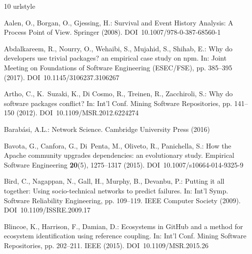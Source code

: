 \documentclass[smallextended]{svjour3}       %
\begin{document}
% 

\providecommand{\noopsort}[1]{}
\begin{thebibliography}{10}
\providecommand{\url}[1]{{#1}}
\providecommand{\urlprefix}{URL }
\expandafter\ifx\csname urlstyle\endcsname\relax
  \providecommand{\doi}[1]{DOI~\discretionary{}{}{}#1}\else
  \providecommand{\doi}{DOI~\discretionary{}{}{}\begingroup
  \urlstyle{rm}\Url}\fi

Aalen, O., Borgan, O., Gjessing, H.: Survival and Event History Analysis: A
  Process Point of View.
\newblock Springer (2008).
\newblock \doi{10.1007/978-0-387-68560-1}

Abdalkareem, R., Nourry, O., Wehaibi, S., Mujahid, S., Shihab, E.: Why do
  developers use trivial packages? an empirical case study on npm.
\newblock In: Joint Meeting on Foundations of Software Engineering
  ({ESEC/FSE}), pp. 385--395 (2017).
\newblock \doi{10.1145/3106237.3106267}

Artho, C., K.~Suzaki, K., {Di Cosmo}, R., Treinen, R., Zacchiroli, S.: Why do
  software packages conflict?
\newblock In: Int'l Conf. Mining Software Repositories, pp. 141--150 (2012).
\newblock \doi{10.1109/MSR.2012.6224274}

Barab\'asi, A.L.: Network Science.
\newblock Cambridge University Press (2016)

Bavota, G., Canfora, G., Di~Penta, M., Oliveto, R., Panichella, S.: How the
  {Apache} community upgrades dependencies: an evolutionary study.
\newblock Empirical Software Engineering \textbf{20}(5), 1275--1317 (2015).
\newblock \doi{10.1007/s10664-014-9325-9}

Bird, C., Nagappan, N., Gall, H., Murphy, B., Devanbu, P.: Putting it all
  together: Using socio-technical networks to predict failures.
\newblock In: Int'l Symp. Software Reliability Engineering, pp. 109--119. IEEE
  Computer Society (2009).
\newblock \doi{10.1109/ISSRE.2009.17}

Blincoe, K., Harrison, F., Damian, D.: Ecosystems in {GitHub} and a method for
  ecosystem identification using reference coupling.
\newblock In: Int'l Conf. Mining Software Repositories, pp. 202--211. IEEE
  (2015).
\newblock \doi{10.1109/MSR.2015.26}


\end{thebibliography}
\end{document}
